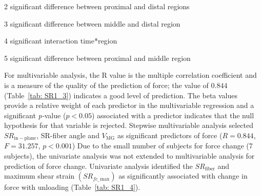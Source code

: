 \begin{landscape}
\begin{table}[!h]
\begin{center}
\begin{threeparttable}
\begin{tablenotes}[flushleft]
\item[2] significant difference between proximal and distal regions
\item[3] significant difference between middle and distal region
\item[4] significant interaction time*region
\item[5] significant difference between proximal and middle region
\end{tablenotes}
\end{threeparttable}
\end{center}
\vspace{-0.2cm}
\end{table}
\end{landscape}
For multivariable analysis, the R value is the multiple correlation coefficient and is a measure of the quality of the prediction of force; the value of $0.844$ (Table~\ref{tab: SR1_3}) indicates a good level of prediction.
The beta values provide a relative weight of each predictor in the multivariable regression and a significant \textit{p-}value ($p < 0.05$) associated with a predictor indicates that the null hypothesis for that variable is rejected. 
Stepwise multivariable analysis selected $SR_{\mathrm{in-plane}}$, SR-fiber angle and $V_{\mathrm{MG}}$ as significant predictors of force ($R=0.844$, $F=31.257$, $p<0.001$)
Due to the small number of subjects for force change (7 subjects), the univariate analysis was not extended to multivariable analysis for prediction of force change. 
Univariate analysis identified the $SR_{\mathrm{fiber}}$ and maximum shear strain $(SR_{fc\_\,\mathrm{max}})$ as significantly associated with change in force with unloading (Table~\ref{tab: SR1_4}). 
